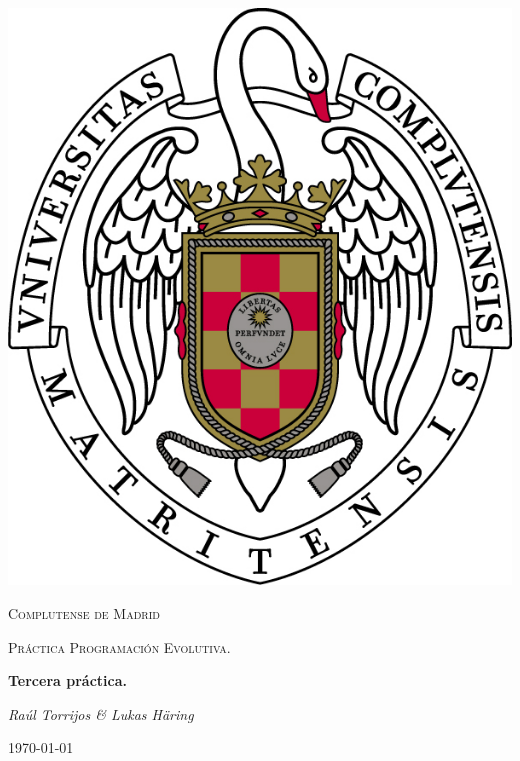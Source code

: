 \documentclass{article}
\begin{document}
\usetikzlibrary{automata,arrows, positioning}
\renewcommand{\contentsname}{Tabla de contenidos}

\begin{titlepage}
	\begin{center}
		\includegraphics{./images/escudo.jpg}
	\end{center}
	\centering
	{\scshape\LARGE Complutense de Madrid \par}
	\vspace{1cm}
	{\scshape\Large Práctica Programación Evolutiva.\par}
	\vspace{1.5cm}
	{\huge\bfseries Tercera práctica. \par}
	\vspace{2cm}
	{\Large\itshape Raúl Torrijos \& Lukas Häring\par}
	\vfill
	\vfill

	{\large \today\par}
\end{titlepage}

\tableofcontents
\end{document}
